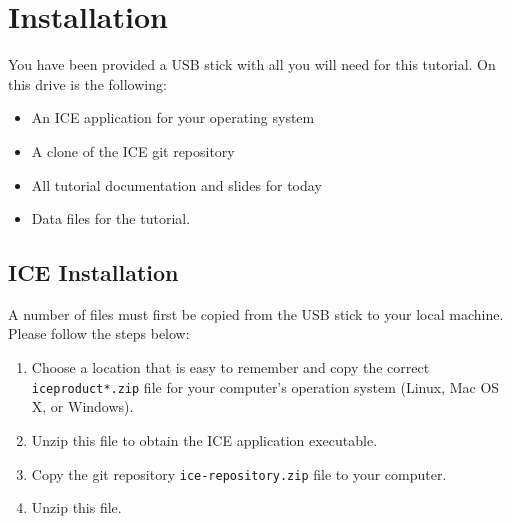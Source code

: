 \section{Installation}
You have been provided a USB stick with all you will need for this tutorial. On
this drive is the following: 
\begin{itemize}
\item An ICE application for your operating system
\item A clone of the ICE git repository
\item All tutorial documentation and slides for today
\item Data files for the tutorial. 
\end{itemize}

\subsection{ICE Installation}
A number of files must first be copied from the USB stick to your local machine. Please
follow the steps below:
\begin{enumerate}
\item Choose a location that is easy to remember
and copy the correct \texttt{ice\-product*.zip} file for your computer's 
operation system (Linux, Mac OS X, or Windows).
\item Unzip this file to obtain the 
ICE application executable.
\item Copy the git repository \texttt{ice-repository.zip} file to your computer.
\item Unzip this file.
\end{enumerate}

